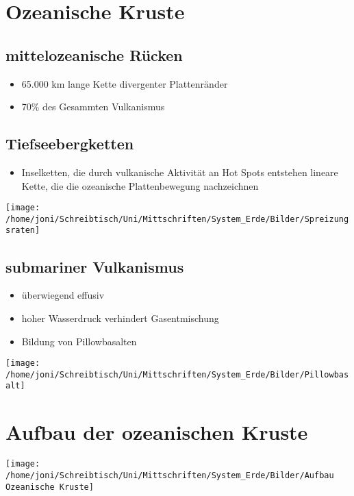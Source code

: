 \documentclass[a4,12pt]{scrreprt}
\begin{document}
\section{Ozeanische Kruste}
\subsection{mittelozeanische Rücken}
\begin{itemize}
\item 65.000 km lange Kette divergenter Plattenränder
\item 70\% des Gesammten Vulkanismus
\end{itemize}

\subsection{Tiefseebergketten}
\begin{itemize}
\item Inselketten, die durch vulkanische Aktivität an Hot Spots entstehen
lineare Kette, die die ozeanische Plattenbewegung nachzeichnen
\end{itemize}

\texttt{[image: /home/joni/Schreibtisch/Uni/Mittschriften/System\_Erde/Bilder/Spreizungsraten]}\\

\subsection{submariner Vulkanismus}
\begin{itemize}
\item überwiegend effusiv
\item hoher Wasserdruck verhindert Gasentmischung
\item Bildung von Pillowbasalten
\end{itemize}

\texttt{[image: /home/joni/Schreibtisch/Uni/Mittschriften/System\_Erde/Bilder/Pillowbasalt]}\\

\section{Aufbau der ozeanischen Kruste}
\texttt{[image: /home/joni/Schreibtisch/Uni/Mittschriften/System\_Erde/Bilder/Aufbau Ozeanische Kruste]}\\
\end{document}
